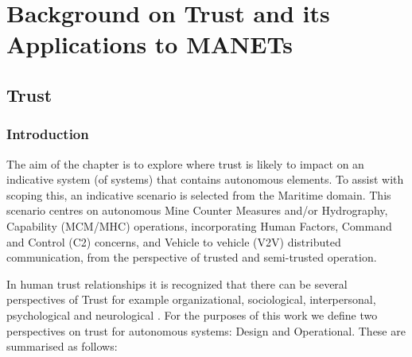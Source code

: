 
\def\ChapterTitle{Background on Trust and its Applications to MANETs} %

\ifx\ifthesis\undefined
	
\else
	\chapter{\ChapterTitle}
	\label{Chapter\thechapter}
\fi

\section{Trust}

\subsection{Introduction}

The aim of the chapter is to explore where trust is likely to impact on an indicative system (of systems) that contains autonomous elements.
To assist with scoping this, an indicative scenario is selected from the Maritime domain.  This scenario centres on autonomous Mine Counter  Measures and/or Hydrography, Capability (MCM/MHC) operations, incorporating Human Factors, Command and Control (C2) concerns, and Vehicle to vehicle (V2V) distributed communication, from the perspective of trusted and semi-trusted operation. 


In human trust relationships it is recognized that there can be several perspectives of Trust for example organizational, sociological, interpersonal, psychological and neurological \cite{Lee2004}.
For the purposes of this work we define two perspectives on trust for autonomous systems: Design and Operational. These are summarised as follows:

